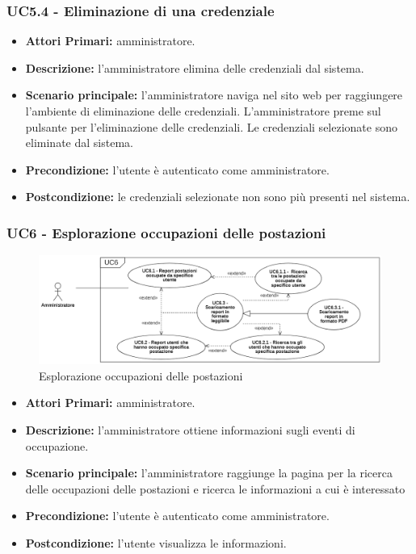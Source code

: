 \subsubsection{ UC5.4 - Eliminazione di una credenziale}
\begin{itemize}
	\item\textbf{Attori Primari:} 
	amministratore.
	\item\textbf{Descrizione:} 
	l'amministratore elimina delle credenziali dal sistema.
	\item\textbf{Scenario principale:} 
	l'amministratore naviga nel sito web per raggiungere l'ambiente di eliminazione delle credenziali.
	L'amministratore preme sul pulsante per l'eliminazione delle credenziali.
	Le credenziali selezionate sono eliminate dal sistema.
	\item\textbf{Precondizione:} 
	l'utente è autenticato come amministratore.
	\item\textbf{Postcondizione:}
	le credenziali selezionate non sono più presenti nel sistema.
\end{itemize}

\subsubsection{ UC6 - Esplorazione occupazioni delle postazioni}
\begin{figure}[H]
	\centering
	\includegraphics[width=18cm]{res/images/UC6.png}
	\caption{Esplorazione occupazioni delle postazioni}
	\label{fig:Esplorazione occupazioni delle postazioni}
\end{figure}
\begin{itemize}
	\item\textbf{Attori Primari:} 
	amministratore.
	\item\textbf{Descrizione:} 
	l'amministratore ottiene informazioni sugli eventi di occupazione.
	\item\textbf{Scenario principale:} 
	l'amministratore raggiunge la pagina per la ricerca delle occupazioni delle postazioni e ricerca le informazioni a cui è interessato
	\item\textbf{Precondizione:} 
	l'utente è autenticato come amministratore.
	\item\textbf{Postcondizione:}
	l'utente visualizza le informazioni.
\end{itemize}

